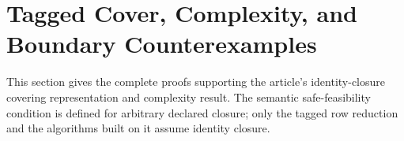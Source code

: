\section{Tagged Cover, Complexity, and Boundary Counterexamples}
\label{sec:or-cover-complexity-proofs}

This section gives the complete proofs supporting the article's
identity-closure covering representation and complexity result. The semantic
safe-feasibility condition is defined for arbitrary declared closure; only the
tagged row reduction and the algorithms built on it assume identity closure.



